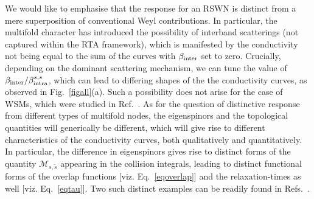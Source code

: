 \documentclass[aps,prb,onecolumn,nofootinbib,citeautoscript,10pt, showkeys]{revtex4-2}
\begin{document}
We would like to emphasise that the response for an RSWN is distinct from a mere superposition of conventional Weyl contributions. In particular, the multifold character has introduced the possibility of interband scatterings (not captured within the RTA framework), which is manifested by the conductivity not being equal to the sum of the curves with $\beta_{\rm inter}$ set to zero. Crucially, depending on the dominant scattering mechanism, we can tune the value of $ \beta_{\rm inter} / \beta_{\rm intra}^{s,s} $, which can lead to differing shapes of the the conductivity curves, as observed in Fig.~\ref{figall}(a). Such a possibility does not arise for the case of WSMs, which were studied in Ref.~\cite{timm}. As for the question of distinctive response from different types of multifold nodes, the eigenspinors and the topological quantities will generically be different, which will give rise to different characteristics of the conductivity curves, both qualitatively and quantitatively. In particular, the difference in eigenspinors gives rise to distinct forms of the quantity $ \mathcal{M}_{ s, \tilde s} $ appearing in the collision integrals, leading to distinct functional forms of the overlap functions [viz. Eq.~\eqref{eqoverlap}] and the relaxation-times as well [viz. Eq.~\eqref{eqtau}]. Two such distinct examples can be readily found in Refs.~\cite{ips-exact-spin1, ips-exact-kwn}.
\end{document}
